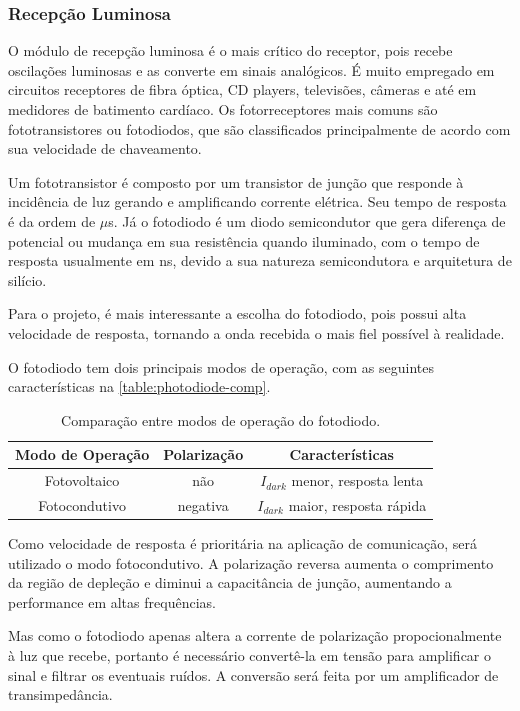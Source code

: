 	\subsubsection*{Recepção Luminosa}\label{section:light-reception}

	O módulo de recepção luminosa é o mais crítico do receptor, pois recebe oscilações luminosas e as converte em sinais analógicos. É muito empregado em circuitos receptores de fibra óptica, CD players, televisões, câmeras e até em medidores de batimento cardíaco. Os fotorreceptores mais comuns são fototransistores ou fotodiodos, que são classificados principalmente de acordo com sua velocidade de chaveamento.

	Um fototransistor é composto por um transistor de junção que responde à incidência de luz gerando e amplificando corrente elétrica. Seu tempo de resposta é da ordem de $\mu$s. Já o fotodiodo é um diodo semicondutor que gera diferença de potencial ou mudança em sua resistência quando iluminado, com o tempo de resposta usualmente em ns, devido a sua natureza semicondutora e arquitetura de silício.

	Para o projeto, é mais interessante a escolha do fotodiodo, pois possui alta velocidade de resposta, tornando a onda recebida o mais fiel possível à realidade.

	O fotodiodo tem dois principais modos de operação, com as seguintes características na \autoref{table:photodiode-comp}.

	\begin{table}[ht]
		\caption{Comparação entre modos de operação do fotodiodo.}
		\centering
		\begin{tabular}{c c c}
			\hline
			Modo de Operação  & Polarização & Características \\ \hline
			Fotovoltaico & não & $I_{dark}$ menor, resposta lenta \\
			Fotocondutivo & negativa & $I_{dark}$ maior, resposta rápida \\ \hline
		\end{tabular}
		\label{table:photodiode-comp}
	\end{table}

	Como velocidade de resposta é prioritária na aplicação de comunicação, será utilizado o modo fotocondutivo. A polarização reversa aumenta o comprimento da região de depleção e diminui a capacitância de junção, aumentando a performance em altas frequências.

	Mas como o fotodiodo apenas altera a corrente de polarização propocionalmente à luz que recebe, portanto é necessário convertê-la em tensão para amplificar o sinal e filtrar os eventuais ruídos. A conversão será feita por um amplificador de transimpedância.

